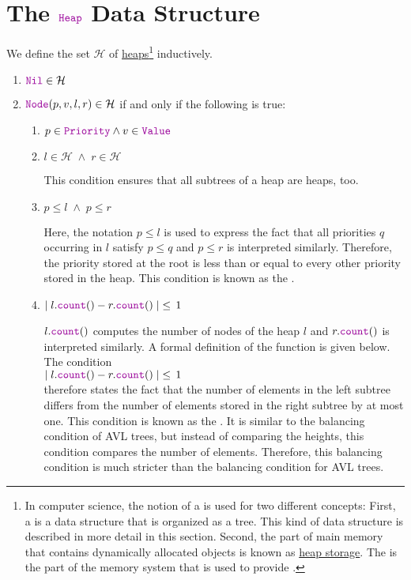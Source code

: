 \section[Heaps]{The $\mytt{Heap}$ Data Structure}
We define the set $\mathcal{H}$ of \href{https://en.wikipedia.org/wiki/Heap_(data_structure)}{heaps}\footnote{
In computer science, the notion of a  is used for two different concepts:
First, a  is a data structure that is organized as a tree.  This kind of data structure
is described in more detail in this section. Second, the part of main memory that contains dynamically
allocated objects is known as 
\href{https://en.wikibooks.org/wiki/Memory_Management/Stacks_and_Heaps}{heap storage}. 
The  is the part of the memory system that is used to provide .
}
inductively. 
\begin{enumerate}
\item $\mytt{Nil} \in \mathcal{H}$
\item $\mytt{Node}(p,v,l,r) \in \mathcal{H}$ if and only if the following is true:
      \begin{enumerate}
      \item $p \in \mytt{Priority} \wedge v \in \mytt{Value}$
      \item $l \in \mathcal{H} \;\wedge\; r \in \mathcal{H}$

            This condition ensures that all subtrees of a heap are heaps, too.
      \item $p \leq l \;\wedge\; p \leq r$

            Here, the notation $p \leq l$ is used to express the fact that all priorities $q$ occurring
            in $l$ satisfy $p \leq q$ and $p \leq r$ is interpreted similarly.  Therefore, 
            the priority stored at the root is less than or equal to every other priority stored in
            the heap. This condition is known as the .
      \item $\mid l.\mytt{count}() - r.\mytt{count}() \mid \;\leq\, 1$

            $l.\mytt{count}()$ computes the number of nodes of the heap $l$ and $r.\mytt{count}()$ is
            interpreted similarly.  A formal definition of the function  is given below.
            The condition 
            \\[0.2cm]
            \hspace*{1.3cm}
            $\mid l.\mytt{count}() - r.\mytt{count}() \mid \;\leq\, 1$ 
            \\[0.2cm]
            therefore states the fact that the number of elements in the left subtree differs from the number
            of elements stored in the right subtree by at most one.
            This condition is known as the  .  It is
            similar to the balancing condition of AVL trees, but instead of comparing the heights, this condition
            compares the number of elements.  Therefore, this balancing condition is much stricter than the
            balancing condition for AVL trees.
      \end{enumerate}
\end{enumerate}
